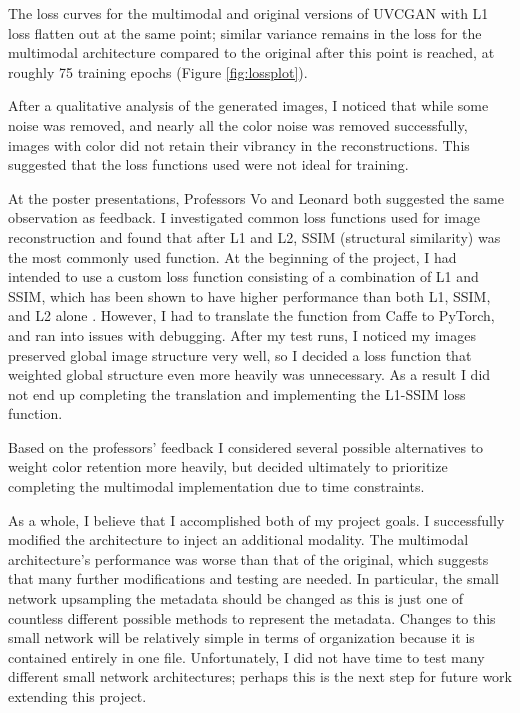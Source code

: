 \documentclass[10pt,twocolumn]{article}
\begin{document}
The loss curves for the multimodal and original versions of UVCGAN with L1 loss flatten out at the same point; similar variance remains in the loss for the multimodal architecture compared to the original after this point is reached, at roughly 75 training epochs (Figure \ref{fig:lossplot}). 

After a qualitative analysis of the generated images, I noticed that while some noise was removed, and nearly all the color noise was removed successfully, images with color did not retain their vibrancy in the reconstructions. This suggested that the loss functions used were not ideal for training. 

At the poster presentations, Professors Vo and Leonard both suggested the same observation as feedback. I investigated common loss functions used for image reconstruction and found that after L1 and L2, SSIM (structural similarity) was the most commonly used function. At the beginning of the project, I had intended to use a custom loss function consisting of a combination of L1 and SSIM, which has been shown to have higher performance than both L1, SSIM, and L2 alone \cite{L1ssim}. However, I had to translate the function from Caffe to PyTorch, and ran into issues with debugging. After my test runs, I noticed my images preserved global image structure very well, so I decided a loss function that weighted global structure even more heavily was unnecessary. As a result I did not end up completing the translation and implementing the L1-SSIM loss function. 

Based on the professors' feedback I considered several possible alternatives to weight color retention more heavily, but decided ultimately to prioritize completing the multimodal implementation due to time constraints.

As a whole, I believe that I accomplished both of my project goals. I successfully modified the architecture to inject an additional modality. The multimodal architecture’s performance was worse than that of the original, which suggests that many further modifications and testing are needed. In particular, the small network upsampling the metadata should be changed as this is just one of countless different possible methods to represent the metadata. Changes to this small network will be relatively simple in terms of organization because it is contained entirely in one file. Unfortunately, I did not have time to test many different small network architectures; perhaps this is the next step for future work extending this project.
\end{document}
